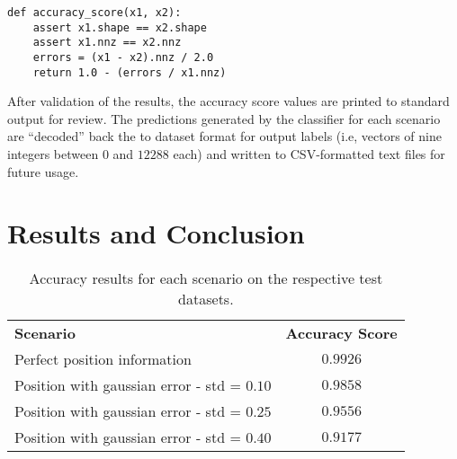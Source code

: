 \documentclass{kthreport}
\theoremstyle{definition}
\begin{document}
\begin{lstlisting}[style=MyPython, caption={Accuracy score function implemented in Python}]
def accuracy_score(x1, x2):
	assert x1.shape == x2.shape
	assert x1.nnz == x2.nnz
	errors = (x1 - x2).nnz / 2.0
	return 1.0 - (errors / x1.nnz)
\end{lstlisting}

After validation of the results, the accuracy score values are printed to standard output for review. 
The predictions generated by the classifier for each scenario are ``decoded'' back the to dataset format for output labels (i.e, vectors of nine integers between $0$ and $12 288$ each) and written to CSV-formatted text files for future usage.


\section{Results and Conclusion}

\begin{table}[hb]
	\centering
	\begin{tabular}{|l|c|}
		\hline 
		\textbf{Scenario} & \textbf{Accuracy Score} \\ 
		Perfect position information & $0.9926$ \\ 
		Position with gaussian error - std = $0.10$ & $0.9858$ \\ 
		Position with gaussian error - std = $0.25$ & $0.9556$ \\ 
		Position with gaussian error - std = $0.40$ & $0.9177$ \\ 
		\hline 
	\end{tabular}
	\caption{Accuracy results for each scenario on the respective test datasets.}
\end{table}

\printbibliography
\end{document}
